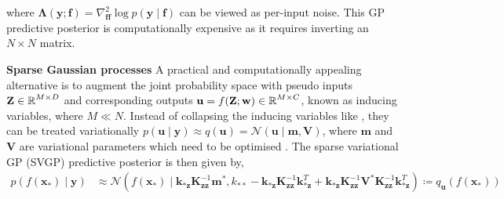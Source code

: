 \documentclass{article}
\newcommand{\inducingInput}{\ensuremath{\mathbf{Z}}}
\newcommand{\inducingVariable}{\ensuremath{\mathbf{u}}}
\newcommand{\transitionParams}{\ensuremath{\mathbf{w}}}
\begin{document}
where $\bm\Lambda(\mathbf{y} ; \mathbf{f}) = \nabla^{2}_{\mathbf{f} \mathbf{f}} \log p(\mathbf{y} \mid \mathbf{f})$ can be viewed as per-input noise. 
This GP predictive posterior is computationally expensive as it requires inverting an $N\times N$ matrix.

\textbf{Sparse Gaussian processes}
A practical and computationally appealing alternative is to augment the joint probability space with pseudo inputs $\mathbf{Z} \in \operatorname{\mathbb{R}}^{M \times D}$
and corresponding outputs
$\mathbf{u} = f(\mathbf{Z}; \transitionParams) \in \R^{M \times C}$, known as inducing variables, where $M \ll N$.
Instead of collapsing the inducing variables like \cite{titsiasVariational2009}, they can be treated variationally
$p(\mathbf{u} \mid \mathbf{y}) \approx q(\mathbf{u}) = \mathcal{N}\left( \mathbf{u} \mid \mathbf{m}, \mathbf{V} \right)$, where $\mathbf{m}$ and $\mathbf{V}$ are variational parameters
which need to be optimised \citep{hensmanGaussian2013}.
The sparse variational GP (SVGP) predictive posterior is then given by,
\begin{align}
\label{eq-dual-svgp-predictive-posterior}
  p(f(\mathbf{x}_{*}) \mid \mathbf{y})
&\approx \mathcal{N} \left( f(\mathbf{x}_{*}) \mid \mathbf{k}_{*\mathbf{z}} \mathbf{K}^{-1}_{\mathbf{z}\mathbf{z}} \mathbf{m}^{*},
  k_{**} - \mathbf{k}_{*\mathbf{z}} \mathbf{K}^{-1}_{\mathbf{z}\mathbf{z}} \mathbf{k}_{*\mathbf{z}}^{T}
  + \mathbf{k}_{*\mathbf{z}} \mathbf{K}^{-1}_{\mathbf{z}\mathbf{z}}  \mathbf{V}^{*}  \mathbf{K}^{-1}_{\mathbf{z}\mathbf{z}} \mathbf{k}_{*\mathbf{z}}^{T}
  \right)
\coloneqq q_{\inducingVariable}(f(\mathbf{x}_{*}))
\end{align}
\end{document}
